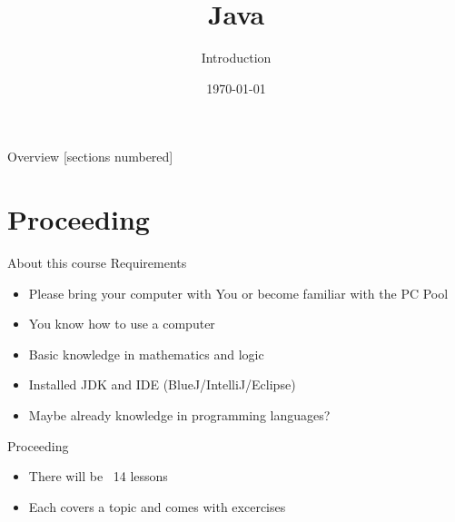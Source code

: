 


\title{Java}
\subtitle{Introduction}
\date{\today}




\begin{frame}
	\titlepage
\end{frame}
\begin{frame}{Overview}
	[sections numbered]
	\tableofcontents
\end{frame}

\section{Proceeding}
\begin{frame}{About this course}
	Requirements
	\begin{itemize}
	           \item Please bring your computer with You or become familiar with the PC Pool
		\item You know how to use a computer
		\item Basic knowledge in mathematics and logic
        		\item Installed JDK and IDE (BlueJ/IntelliJ/Eclipse)
		\item Maybe already knowledge in programming languages?
	\end{itemize}
	Proceeding
	\begin{itemize}
		\item There will be ~14 lessons
		\item Each covers a topic and comes with excercises
	\end{itemize}
\end{frame}

